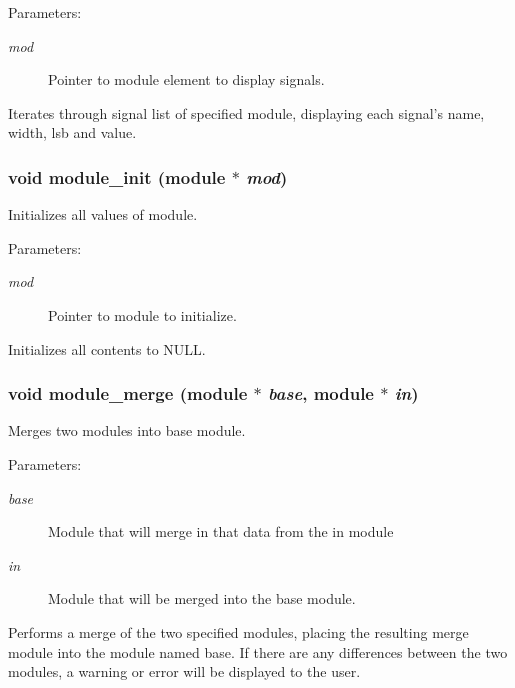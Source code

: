 \begin{Desc}
\item[Parameters: ]\par
\begin{description}
\item[{\em 
mod}]Pointer to module element to display signals.\end{description}
\end{Desc}
Iterates through signal list of specified module, displaying each signal's name, width, lsb and value. 
\subsubsection{\setlength{\rightskip}{0pt plus 5cm}void module\_\-init ({\bf module} $\ast$ {\em mod})}\label{module_8h_a0}


Initializes all values of module.

\begin{Desc}
\item[Parameters: ]\par
\begin{description}
\item[{\em 
mod}]Pointer to module to initialize.\end{description}
\end{Desc}
Initializes all contents to NULL. 
\subsubsection{\setlength{\rightskip}{0pt plus 5cm}void module\_\-merge ({\bf module} $\ast$ {\em base}, {\bf module} $\ast$ {\em in})}\label{module_8h_a2}


Merges two modules into base module.

\begin{Desc}
\item[Parameters: ]\par
\begin{description}
\item[{\em 
base}]Module that will merge in that data from the in module \item[{\em 
in}]Module that will be merged into the base module.\end{description}
\end{Desc}
Performs a merge of the two specified modules, placing the resulting merge module into the module named base. If there are any differences between the two modules, a warning or error will be displayed to the user. 